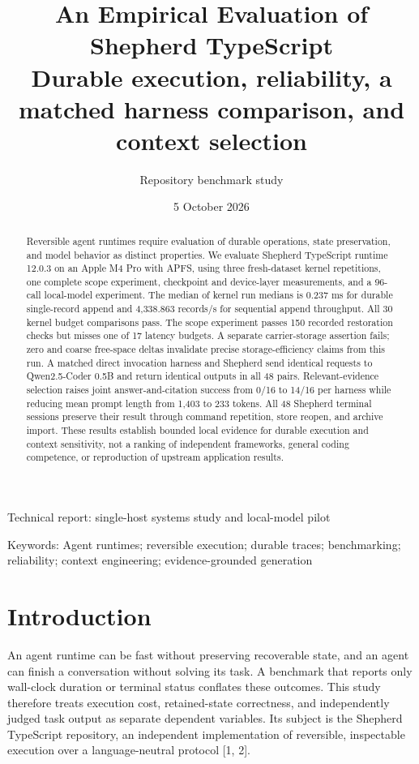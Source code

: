 \documentclass[11pt,a4paper]{article}
\title{An Empirical Evaluation of Shepherd TypeScript\\[5pt]\large Durable execution, reliability, a matched harness comparison, and context selection}
\author{Repository benchmark study}
\date{5 October 2026}
\begin{document}
\maketitle

\begin{center}\small Technical report: single-host systems study and local-model pilot\end{center}

\begin{abstract}

Reversible agent runtimes require evaluation of durable operations, state preservation, and model behavior as distinct properties. We evaluate Shepherd TypeScript runtime 12.0.3 on an Apple M4 Pro with APFS, using three fresh-dataset kernel repetitions, one complete scope experiment, checkpoint and device-layer measurements, and a 96-call local-model experiment. The median of kernel run medians is 0.237 ms for durable single-record append and 4,338.863 records/s for sequential append throughput. All 30 kernel budget comparisons pass. The scope experiment passes 150 recorded restoration checks but misses one of 17 latency budgets. A separate carrier-storage assertion fails; zero and coarse free-space deltas invalidate precise storage-efficiency claims from this run. A matched direct invocation harness and Shepherd send identical requests to Qwen2.5-Coder 0.5B and return identical outputs in all 48 pairs. Relevant-evidence selection raises joint answer-and-citation success from 0/16 to 14/16 per harness while reducing mean prompt length from 1,403 to 233 tokens. All 48 Shepherd terminal sessions preserve their result through command repetition, store reopen, and archive import. These results establish bounded local evidence for durable execution and context sensitivity, not a ranking of independent frameworks, general coding competence, or reproduction of upstream application results.


\end{abstract}

Keywords: Agent runtimes; reversible execution; durable traces; benchmarking; reliability; context engineering; evidence-grounded generation


\section{Introduction}

An agent runtime can be fast without preserving recoverable state, and an agent can finish a conversation without solving its task. A benchmark that reports only wall-clock duration or terminal status conflates these outcomes. This study therefore treats execution cost, retained-state correctness, and independently judged task output as separate dependent variables. Its subject is the Shepherd TypeScript repository, an independent implementation of reversible, inspectable execution over a language-neutral protocol [1, 2].
\end{document}
